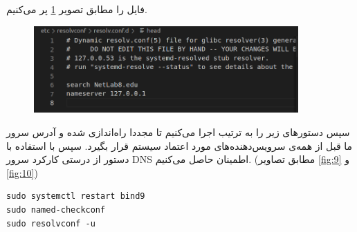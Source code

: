 \documentclass{article}
\begin{document}
فایل 
را مطابق تصویر \ref{fig:8} پر می‌کنیم.

\begin{figure}[h!]
	\centering
	\includegraphics[width=0.9\textwidth]{src/8.png}
	\caption{}
	\label{fig:8}
\end{figure}

سپس دستور‌های زیر را به ترتیب اجرا می‌کنیم تا  مجددا راه‌اندازی شده و آدرس سرور ما قبل از همه‌ی سرویس‌دهنده‌های مورد اعتماد سیستم قرار بگیرد. سپس با استفاده با دستور  از درستی کارکرد سرور DNS اطمینان حاصل می‌کنیم. (مطابق تصاویر \ref{fig:9} و \ref{fig:10})
\begin{latin}
	\begin{lstlisting}
sudo systemctl restart bind9
sudo named-checkconf
sudo resolvconf -u
	\end{lstlisting}
\end{latin}
\end{document}
